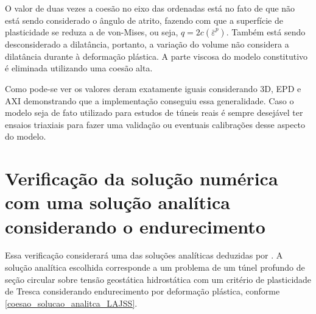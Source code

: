 O valor de duas vezes a coesão no eixo das ordenadas está no fato de que não está sendo considerado o ângulo de atrito, fazendo com que a superfície de plasticidade se reduza a de von-Mises, ou seja, $q = 2c(\bar \varepsilon^p)$. Também está sendo desconsiderado a dilatância, portanto, a variação do volume não considera a dilatância durante à deformação plástica. A parte viscosa do modelo constitutivo é eliminada utilizando uma coesão alta.

Como pode-se ver os valores deram exatamente iguais considerando 3D, EPD e AXI demonstrando que a implementação conseguiu essa generalidade. Caso o modelo seja de fato utilizado para estudos de túneis reais é sempre desejável ter ensaios triaxiais para fazer uma validação ou eventuais calibrações desse aspecto do modelo.

\section{Verificação da solução numérica com uma solução analítica considerando o endurecimento}

Essa verificação considerará uma das soluções analíticas deduzidas por . A solução analítica escolhida corresponde a um problema de um túnel profundo de seção circular sobre tensão geostática hidrostática com um critério de plasticidade de Tresca considerando endurecimento por deformação plástica, conforme \autoref{coesao_solucao_analitca_LAJSS}. 

